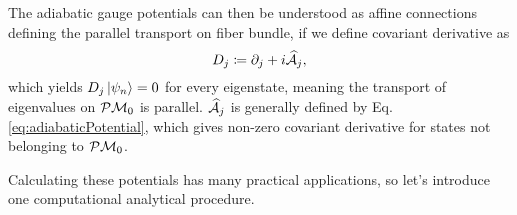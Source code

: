 The adiabatic gauge potentials can then be understood as affine connections defining the parallel transport on fiber bundle, if we define covariant derivative as
\begin{equation}
    D_j\coloneqq\partial_j+i\AA_j,
\end{equation}
which yields $D_j\ket{\psi_n}=0$ for every eigenstate, meaning the transport of eigenvalues on $\P\M_0$ is parallel. $\AA_j$ is generally defined by Eq. \ref{eq:adiabaticPotential}, which gives non-zero covariant derivative for states not belonging to $\P\M_0$. 

Calculating these potentials has many practical applications, so let's introduce one computational analytical procedure.








